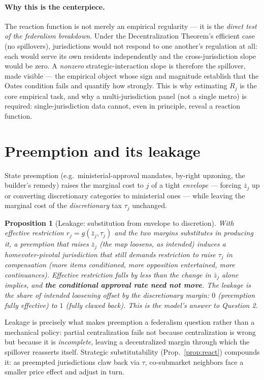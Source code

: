 \documentclass[11pt]{article}
\newtheorem{proposition}{Proposition}
\begin{document}
\paragraph{Why this is the centerpiece.} The reaction function is not merely an empirical
regularity --- it is the \emph{direct test of the federalism breakdown}. Under the
Decentralization Theorem's efficient case (no spillovers), jurisdictions would not respond to one
another's regulation at all: each would serve its own residents independently and the
cross-jurisdiction slope would be zero. A \emph{nonzero} strategic-interaction slope is therefore
the spillover, made visible --- the empirical object whose sign and magnitude establish that the
Oates condition fails and quantify how strongly. This is why estimating $R_j$ is the core
empirical task, and why a multi-jurisdiction panel (not a single metro) is required:
single-jurisdiction data cannot, even in principle, reveal a reaction function.

\section{Preemption and its leakage}\label{sec:preempt}

State preemption (e.g.\ ministerial-approval mandates, by-right upzoning, the builder's remedy)
raises the marginal cost to $j$ of a tight \emph{envelope} --- forcing $\bar z_j$ up or
converting discretionary categories to ministerial ones --- while leaving the marginal cost of
the \emph{discretionary} tax $\tau_j$ unchanged.

\begin{proposition}[Leakage: substitution from envelope to discretion]\label{prop:leak}
With effective restriction $r_j=g(\bar z_j,\tau_j)$ and the two margins substitutes in producing
it, a preemption that raises $\bar z_j$ (the map loosens, as intended) induces a
homevoter-pivotal jurisdiction that still demands restriction to raise $\tau_j$ in compensation
(more items conditioned, more opposition entertained, more continuances). Effective restriction
falls by \emph{less} than the change in $\bar z_j$ alone implies, and \textbf{the conditional
approval rate need not move}. The \emph{leakage} is the share of intended loosening offset by the
discretionary margin: $0$ (preemption fully effective) to $1$ (fully clawed back). This is the
model's answer to Question 2.
\end{proposition}

\noindent Leakage is precisely what makes preemption a federalism question rather than a
mechanical policy: partial centralization fails not because centralization is wrong but because
it is \emph{incomplete}, leaving a decentralized margin through which the spillover reasserts
itself. Strategic substitutability (Prop.~\ref{prop:react}) compounds it: as preempted
jurisdictions claw back via $\tau$, co-submarket neighbors face a smaller price effect and adjust
in turn.
\end{document}
